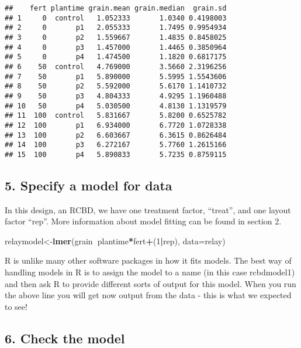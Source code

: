 \documentclass[]{book}
\newenvironment{Shaded}{\begin{snugshade}}{\end{snugshade}}
\newcommand{\KeywordTok}[1]{\textcolor[rgb]{0.13,0.29,0.53}{\textbf{#1}}}
\newcommand{\DataTypeTok}[1]{\textcolor[rgb]{0.13,0.29,0.53}{#1}}
\newcommand{\DecValTok}[1]{\textcolor[rgb]{0.00,0.00,0.81}{#1}}
\newcommand{\OperatorTok}[1]{\textcolor[rgb]{0.81,0.36,0.00}{\textbf{#1}}}
\newcommand{\NormalTok}[1]{#1}
\theoremstyle{definition}
\theoremstyle{definition}
\theoremstyle{definition}
\theoremstyle{remark}
\begin{document}
\begin{verbatim}
##    fert plantime grain.mean grain.median  grain.sd
## 1     0  control   1.052333       1.0340 0.4198003
## 2     0       p1   2.055333       1.7495 0.9954934
## 3     0       p2   1.559667       1.4835 0.8458025
## 4     0       p3   1.457000       1.4465 0.3850964
## 5     0       p4   1.474500       1.1820 0.6817175
## 6    50  control   4.769000       3.5660 2.3196256
## 7    50       p1   5.890000       5.5995 1.5543606
## 8    50       p2   5.592000       5.6170 1.1410732
## 9    50       p3   4.804333       4.9295 1.1960488
## 10   50       p4   5.030500       4.8130 1.1319579
## 11  100  control   5.831667       5.8200 0.6525782
## 12  100       p1   6.934000       6.7720 1.0728338
## 13  100       p2   6.603667       6.3615 0.8626484
## 14  100       p3   6.272167       5.7760 1.2615166
## 15  100       p4   5.890833       5.7235 0.8759115
\end{verbatim}

\subsection{5. Specify a model for
data}\label{specify-a-model-for-data-3}

In this design, an RCBD, we have one treatment factor, ``treat'', and
one layout factor ``rep''. More information about model fitting can be
found in section 2.

\begin{Shaded}
\begin{Highlighting}[]
\NormalTok{relaymodel<-}\KeywordTok{lmer}\NormalTok{(grain}\OperatorTok{~}\NormalTok{plantime}\OperatorTok{*}\NormalTok{fert}\OperatorTok{+}\NormalTok{(}\DecValTok{1}\OperatorTok{|}\NormalTok{rep), }\DataTypeTok{data=}\NormalTok{relay)}
\end{Highlighting}
\end{Shaded}

R is unlike many other software packages in how it fits models. The best
way of handling models in R is to assign the model to a name (in this
case rcbdmodel1) and then ask R to provide different sorts of output for
this model. When you run the above line you will get now output from the
data - this is what we expected to see!

\subsection{6. Check the model}\label{check-the-model-3}
\end{document}
